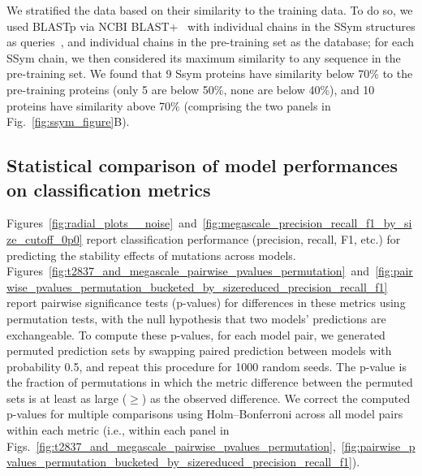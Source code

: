 We stratified the data based on their similarity to the training data. To do so, we used BLASTp via
NCBI BLAST+~\cite{camacho_blast_2009} with individual chains in the SSym structures as
queries~\cite{pucci_quantification_2018}, and individual chains in the pre-training set as the
database; for each SSym chain, we then considered its maximum similarity to any sequence in the
pre-training set. We found that 9 Ssym proteins have similarity below 70\% to the pre-training
proteins (only 5 are below 50\%, none are below 40\%), and 10 proteins have similarity above 70\%
(comprising the two panels in Fig.~\ref{fig:ssym_figure}B).\\


\subsection{Statistical comparison of model performances on classification metrics}

Figures~\ref{fig:radial_plots__noise}~and~\ref{fig:megascale_precision_recall_f1_by_size_cutoff_0p0}
report classification performance (precision, recall, F1, etc.) for predicting the stability effects
of mutations across models.
Figures~\ref{fig:t2837_and_megascale_pairwise_pvalues_permutation}~and~\ref{fig:pairwise_pvalues_permutation_bucketed_by_sizereduced_precision_recall_f1}
report pairwise significance tests (p-values) for differences in these metrics using permutation
tests, with the null hypothesis that two models' predictions are exchangeable. To compute these
p-values, for each model pair, we generated permuted prediction sets by swapping paired prediction
between models with probability 0.5, and repeat this procedure for 1000 random seeds. The p-value is
the fraction of permutations in which the metric difference between the permuted sets is at least as
large ($\geq$) as the observed difference. We correct the computed p-values for multiple comparisons
using Holm–Bonferroni across all model pairs within each metric (i.e., within each panel in
Figs.~\ref{fig:t2837_and_megascale_pairwise_pvalues_permutation},~\ref{fig:pairwise_pvalues_permutation_bucketed_by_sizereduced_precision_recall_f1}).\\


